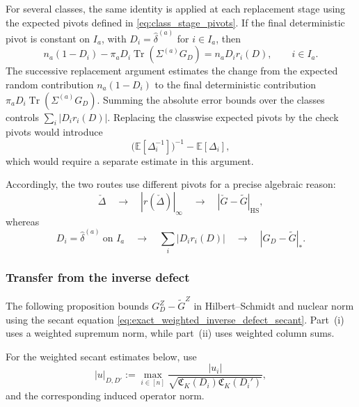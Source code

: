 \documentclass[EJP, preprint, NODS, nobera, nofontexpansion]{ejpecp}
\DeclareMathOperator{\tr}{Tr}
\DeclareMathOperator{\hs}{HS}
\begin{document}
For several classes, the same identity is applied at each replacement
stage using the expected pivots defined in
\eqref{eq:class_stage_pivots}.  If the final deterministic pivot is constant on \(I_a\), with
\(D_i=\widehat\delta^{(a)}\) for \(i\in I_a\), then
\[
    n_a(1-D_i)
    -
    \pi_aD_i
    \tr(\Sigma^{(a)}G_D)
    =
    n_aD_ir_i(D),
    \qquad i\in I_a.
\]
The successive replacement argument estimates the change from the
expected random contribution \(n_a(1-D_i)\) to the final deterministic
contribution
\(\pi_aD_i\tr(\Sigma^{(a)}G_D)\).  Summing the absolute error bounds over the classes controls
\(\sum_i|D_i r_i(D)|\).  Replacing the classwise
expected pivots by the check pivots would introduce
\[
    \bigl(\mathbb E[\Delta_i^{-1}]\bigr)^{-1}
    -
    \mathbb E[\Delta_i],
\]
which would require a separate estimate in this argument.

Accordingly, the two routes use different pivots for a precise
algebraic reason:
\[
    \check\Delta
    \quad\longrightarrow\quad
    |r(\check\Delta)|_\infty
    \quad\longrightarrow\quad
    |\check G-\widetilde G|_{\hs},
\]
whereas
\[
    D_i=\widehat\delta^{(a)}
    \ \text{on }I_a
    \quad\longrightarrow\quad
    \sum_i|D_ir_i(D)|
    \quad\longrightarrow\quad
    |G_D-\widetilde G|_*.
\]

\subsubsection{Transfer from the inverse defect}
\label{sse:weighted_pivot_transfer}

The following proposition bounds \(G_D^Z-\widetilde G^Z\) in
Hilbert--Schmidt and nuclear norm using the secant equation
\eqref{eq:exact_weighted_inverse_defect_secant}.
Part~\textnormal{(i)} uses a weighted supremum norm, while
part~\textnormal{(ii)} uses weighted column sums.





For the weighted secant estimates below, use
\[
    |u|_{D,D'}
    :=
    \max_{i\in[n]}
    \frac{|u_i|}
    {\sqrt{\mathfrak C_K(D_i)
           \mathfrak C_K(D_i')}},
\]
and the corresponding induced operator norm.
\end{document}
